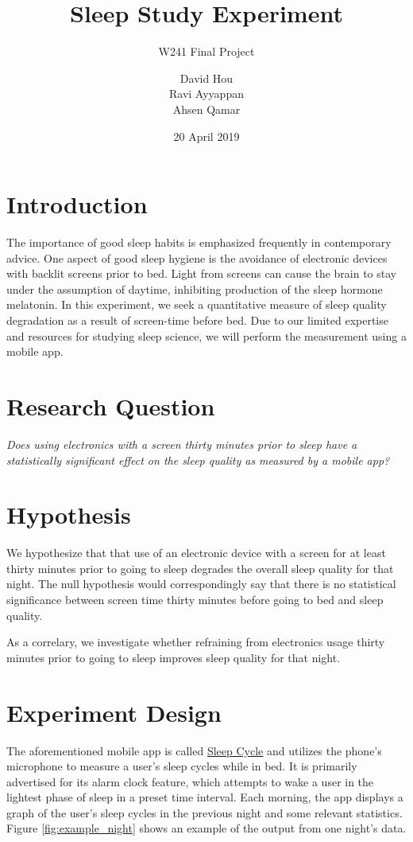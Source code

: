 \documentclass[12pt,]{article}
\title{Sleep Study Experiment}
\subtitle{W241 Final Project}
\author{David Hou \\ Ravi Ayyappan \\ Ahsen Qamar}
\date{20 April 2019}
\begin{document}
\maketitle

\section{Introduction}\label{introduction}

The importance of good sleep habits is emphasized frequently in
contemporary advice. One aspect of good sleep hygiene is the avoidance
of electronic devices with backlit screens prior to bed. Light from
screens can cause the brain to stay under the assumption of daytime,
inhibiting production of the sleep hormone melatonin. In this
experiment, we seek a quantitative measure of sleep quality degradation
as a result of screen-time before bed. Due to our limited expertise and
resources for studying sleep science, we will perform the measurement
using a mobile app.

\section{Research Question}\label{research-question}

\emph{Does using electronics with a screen thirty minutes prior to sleep
have a statistically significant effect on the sleep quality as measured
by a mobile app?}

\section{Hypothesis}\label{hypothesis}

We hypothesize that that use of an electronic device with a screen for
at least thirty minutes prior to going to sleep degrades the overall
sleep quality for that night. The null hypothesis would correspondingly
say that there is no statistical significance between screen time thirty
minutes before going to bed and sleep quality.

As a correlary, we investigate whether refraining from electronics usage
thirty minutes prior to going to sleep improves sleep quality for that
night.

\section{Experiment Design}\label{experiment-design}

The aforementioned mobile app is called \href{www.sleepcycle.com}{Sleep
Cycle} and utilizes the phone's microphone to measure a user's sleep
cycles while in bed. It is primarily advertised for its alarm clock
feature, which attempts to wake a user in the lightest phase of sleep in
a preset time interval. Each morning, the app displays a graph of the
user's sleep cycles in the previous night and some relevant statistics.
Figure \ref{fig:example_night} shows an example of the output from one
night's data.
\end{document}
